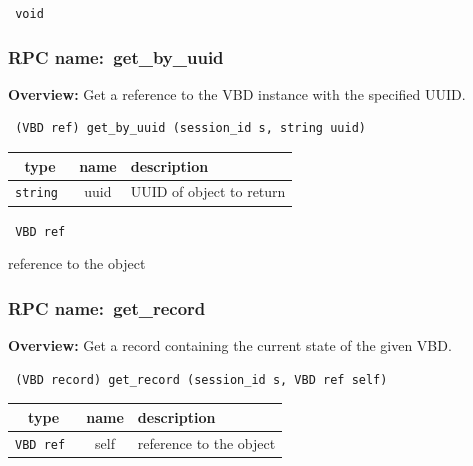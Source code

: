 \vspace{0.3cm}

{\tt 
void
}



\vspace{0.3cm}
\vspace{0.3cm}
\vspace{0.3cm}
\subsubsection{RPC name:~get\_by\_uuid}

{\bf Overview:} 
Get a reference to the VBD instance with the specified UUID.

\begin{verbatim} (VBD ref) get_by_uuid (session_id s, string uuid)\end{verbatim}



 
\vspace{0.3cm}
\begin{tabular}{|c|c|p{7cm}|}
 \hline
{\bf type} & {\bf name} & {\bf description} \\ \hline
{\tt string } & uuid & UUID of object to return \\ \hline 

\end{tabular}

\vspace{0.3cm}

{\tt 
VBD ref
}


reference to the object
\vspace{0.3cm}
\vspace{0.3cm}
\vspace{0.3cm}
\subsubsection{RPC name:~get\_record}

{\bf Overview:} 
Get a record containing the current state of the given VBD.

\begin{verbatim} (VBD record) get_record (session_id s, VBD ref self)\end{verbatim}



 
\vspace{0.3cm}
\begin{tabular}{|c|c|p{7cm}|}
 \hline
{\bf type} & {\bf name} & {\bf description} \\ \hline
{\tt VBD ref } & self & reference to the object \\ \hline 

\end{tabular}

